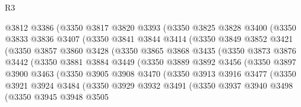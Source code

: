 \begin{lexlean}{R3}
\begin{coremodule}
              @3812
              @3386
              (@3350
                @3817
                @3820
                @3393
                (@3350
                  @3825
                  @3828
                  @3400
                  (@3350
                    @3833
                    @3836
                    @3407
                    (@3350
                      @3841
                      @3844
                      @3414
                      (@3350
                        @3849
                        @3852
                        @3421
                        (@3350
                          @3857
                          @3860
                          @3428
                          (@3350
                            @3865
                            @3868
                            @3435
                            (@3350
                              @3873
                              @3876
                              @3442
                              (@3350
                                @3881
                                @3884
                                @3449
                                (@3350
                                  @3889
                                  @3892
                                  @3456
                                  (@3350
                                    @3897
                                    @3900
                                    @3463
                                    (@3350
                                      @3905
                                      @3908
                                      @3470
                                      (@3350
                                        @3913
                                        @3916
                                        @3477
                                        (@3350
                                          @3921
                                          @3924
                                          @3484
                                          (@3350
                                            @3929
                                            @3932
                                            @3491
                                            (@3350
                                              @3937
                                              @3940
                                              @3498
                                              (@3350
                                                @3945
                                                @3948
                                                @3505

\end{coremodule}
\end{lexlean}
